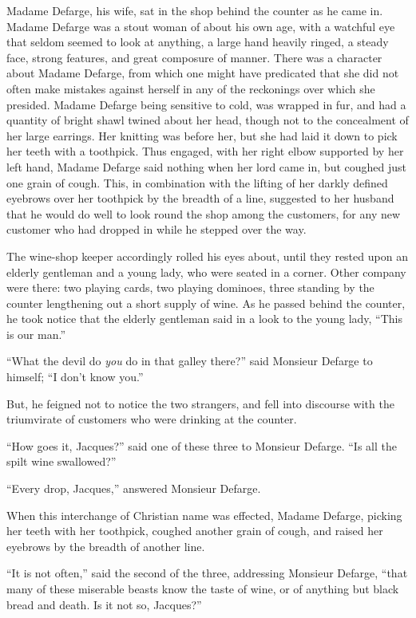 Madame Defarge, his wife, sat in the shop behind the counter as he
came in.  Madame Defarge was a stout woman of about his own age, with
a watchful eye that seldom seemed to look at anything, a large hand
heavily ringed, a steady face, strong features, and great composure
of manner.  There was a character about Madame Defarge, from which
one might have predicated that she did not often make mistakes against
herself in any of the reckonings over which she presided.  Madame
Defarge being sensitive to cold, was wrapped in fur, and had a
quantity of bright shawl twined about her head, though not to the
concealment of her large earrings.  Her knitting was before her, but
she had laid it down to pick her teeth with a toothpick.  Thus
engaged, with her right elbow supported by her left hand, Madame
Defarge said nothing when her lord came in, but coughed just one
grain of cough.  This, in combination with the lifting of her darkly
defined eyebrows over her toothpick by the breadth of a line, suggested
to her husband that he would do well to look round the shop among the
customers, for any new customer who had dropped in while he stepped
over the way.

The wine-shop keeper accordingly rolled his eyes about, until they
rested upon an elderly gentleman and a young lady, who were seated in
a corner.  Other company were there:  two playing cards, two playing
dominoes, three standing by the counter lengthening out a short
supply of wine.  As he passed behind the counter, he took notice that
the elderly gentleman said in a look to the young lady, ``This is our
man.''

``What the devil do \emph{you} do in that galley there?'' said Monsieur
Defarge to himself; ``I don't know you.''

But, he feigned not to notice the two strangers, and fell into
discourse with the triumvirate of customers who were drinking at the
counter.

``How goes it, Jacques?'' said one of these three to Monsieur Defarge.
``Is all the spilt wine swallowed?''

``Every drop, Jacques,'' answered Monsieur Defarge.

When this interchange of Christian name was effected, Madame Defarge,
picking her teeth with her toothpick, coughed another grain of cough,
and raised her eyebrows by the breadth of another line.

``It is not often,'' said the second of the three, addressing Monsieur
Defarge, ``that many of these miserable beasts know the taste of wine,
or of anything but black bread and death.  Is it not so, Jacques?''


